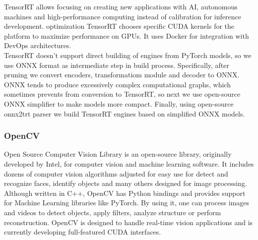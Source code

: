 \documentclass[../Main.tex]{subfiles}
\begin{document}
    TensorRT allows focusing on creating new applications with AI, autonomous machines
    and high-performance computing instead of calibration for inference development.
     optimization TensorRT chooses specific CUDA kernels for the platform to maximize
    performance on GPUs. It uses Docker for integration with DevOps architectures.\\
    TensorRT doesn't support direct building of engines from PyTorch models, so 
    we use ONNX format as intermediate step in build process. Specifically, after
    pruning we convert encoders, transformatiom module and decoder to ONNX. 
    ONNX tends to produce excessively complex computational graphs, which sometimes
    prevents from conversion to TensorRT, so next we use open-source ONNX simplifier 
    \cite{onnxsim} to make models more compact. Finally, using open-source
    onnx2trt parser \cite{onnx2trt} we build TensorRT engines based on simplified
    ONNX models.
    

    \subsubsection{OpenCV}
    Open Source Computer Vision Library is an open-source library, originally developed by Intel, for computer vision and machine learning software. It includes dozens of computer vision algorithms adjusted for easy use for detect and recognize faces, identify objects and many others designed for image processing. Although written in C++, OpenCV has Python bindings and provides support for Machine Learning libraries like PyTorch.  By using it, one can process images and videos to detect objects, apply filters, analyze structure or perform reconstruction. OpenCV is designed to handle real-time vision applications and is currently developing full-featured CUDA interfaces.
\end{document}
